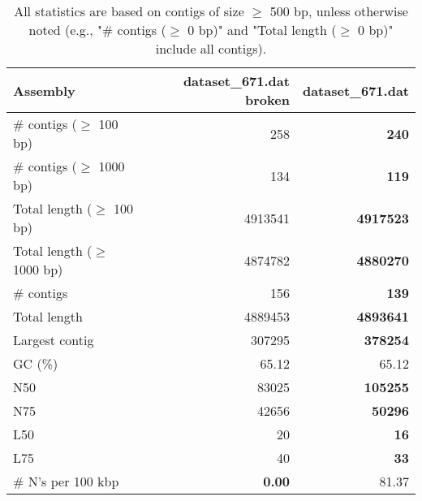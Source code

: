\documentclass[12pt,a4paper]{article}
\begin{document}
\begin{table}[ht]
\begin{center}
\caption{All statistics are based on contigs of size $\geq$ 500 bp, unless otherwise noted (e.g., "\# contigs ($\geq$ 0 bp)" and "Total length ($\geq$ 0 bp)" include all contigs).}
\begin{tabular}{|l*{2}{|r}|}
\hline
Assembly & dataset\_671.dat broken & dataset\_671.dat \\ \hline
\# contigs ($\geq$ 100 bp) & 258 & {\bf 240} \\ \hline
\# contigs ($\geq$ 1000 bp) & 134 & {\bf 119} \\ \hline
Total length ($\geq$ 100 bp) & 4913541 & {\bf 4917523} \\ \hline
Total length ($\geq$ 1000 bp) & 4874782 & {\bf 4880270} \\ \hline
\# contigs & 156 & {\bf 139} \\ \hline
Total length & 4889453 & {\bf 4893641} \\ \hline
Largest contig & 307295 & {\bf 378254} \\ \hline
GC (\%) & 65.12 & 65.12 \\ \hline
N50 & 83025 & {\bf 105255} \\ \hline
N75 & 42656 & {\bf 50296} \\ \hline
L50 & 20 & {\bf 16} \\ \hline
L75 & 40 & {\bf 33} \\ \hline
\# N's per 100 kbp & {\bf 0.00} & 81.37 \\ \hline
\end{tabular}
\end{center}
\end{table}
\end{document}
